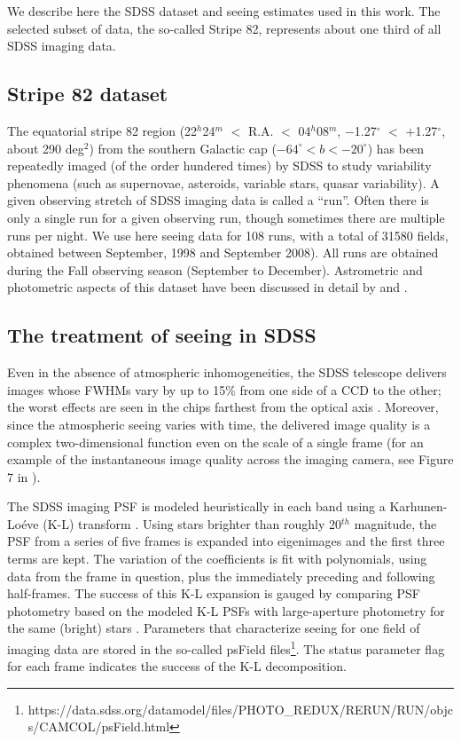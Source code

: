 

We describe here the SDSS dataset and seeing estimates used in this work. The
selected subset of data, the so-called Stripe 82, represents about one third of
all SDSS imaging data. 

\subsection{Stripe 82 dataset} 

The equatorial stripe 82 region (22$^h$24$^m$ $<$ R.A. $<$ 04$^h$08$^m$, $-$1.27$^\circ$  $<$ $+$1.27$^\circ$, about 
290 deg$^2$) from the southern Galactic cap ($-64^\circ < b <  -20^\circ$) has been repeatedly imaged (of the order
hundered times) by SDSS to study variability phenomena (such as supernovae, asteroids, variable stars, quasar 
variability). A given observing stretch of SDSS imaging data is called a ``run''. Often there is only a single
run for a given observing run, though sometimes there are multiple runs per night. We use here seeing data for 
108 runs, with a total of 31580 fields, obtained between September, 1998 and September 2008). All
runs are obtained during the Fall observing season (September to December). Astrometric and photometric aspects 
of this dataset have been discussed in detail by \cite{Ivezic2007} and \cite{Sesar2007}. 


\subsection{The treatment of seeing in SDSS}
 
Even in the absence of atmospheric inhomogeneities, the SDSS telescope delivers images whose 
FWHMs vary by up to 15\% from one side of a CCD to the other; the worst effects are seen in 
the chips farthest from the optical axis \citep{Gunn2006}. Moreover, since the atmospheric 
seeing varies with time, the delivered image quality is a complex two-dimensional function 
even on the scale of a single frame (for an example of the instantaneous image quality across 
the imaging camera, see Figure 7 in \citealt{SDSSEDR}). 
 
The SDSS imaging PSF is modeled 
heuristically in each band using a Karhunen-Lo\'{e}ve (K-L) transform \citep{Lupton2002}. 
Using stars brighter than roughly 20$^{th}$ magnitude, the PSF from a series of five frames is expanded 
into eigenimages and the first three terms are kept. The variation of the coefficients is fit 
with polynomials, using data from the frame in question, plus the immediately preceding and following 
half-frames. The success of this K-L expansion is gauged by comparing PSF photometry based on the 
modeled K-L PSFs with large-aperture photometry for the same (bright) stars \citep{SDSSEDR}. 
Parameters that characterize seeing for one field of imaging data are stored in the so-called psField 
files\footnote{https://data.sdss.org/datamodel/files/PHOTO\_REDUX/RERUN/RUN/objcs/CAMCOL/psField.html}. 
The status parameter flag for each frame indicates the success of the K-L decomposition.

